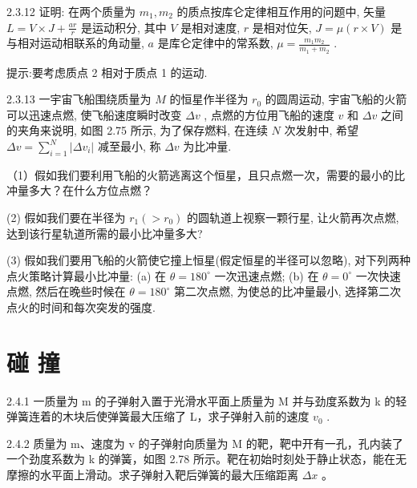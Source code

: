 \begin{problem}{2.3.12}
证明: 在两个质量为 $m_{1}, m_{2}$ 的质点按库仑定律相互作用的问题中, 矢量 $L = V \times J + \frac{ar}{r}$ 是运动积分, 其中 $V$ 是相对速度, $r$ 是相对位矢, $J = \mu(r \times V)$ 是与相对运动相联系的角动量, $a$ 是库仑定律中的常系数, $\mu = \frac{m_1 m_2}{m_1 + m_2}$ .

提示:要考虑质点 2 相对于质点 1 的运动.
\end{problem}
\clearpage


\begin{problem}{2.3.13}
一宇宙飞船围绕质量为 $M$ 的恒星作半径为 $r_0$ 的圆周运动, 宇宙飞船的火箭可以迅速点燃, 使飞船速度瞬时改变 $\Delta v$ , 点燃的方位用飞船的速度 $v$ 和 $\Delta v$ 之间的夹角来说明, 如图 2.75 所示, 为了保存燃料, 在连续 $N$ 次发射中, 希望 $\Delta v = \sum_{i=1}^{N} |\Delta v_i|$ 减至最小, 称 $\Delta v$ 为比冲量.

（1）假如我们要利用飞船的火箭逃离这个恒星，且只点燃一次，需要的最小的比冲量多大？在什么方位点燃？

(2) 假如我们要在半径为 $r_{1}(>r_{0})$ 的圆轨道上视察一颗行星, 让火箭再次点燃, 达到该行星轨道所需的最小比冲量多大?

(3) 假如我们要用飞船的火箭使它撞上恒星(假定恒星的半径可以忽略), 对下列两种点火策略计算最小比冲量: (a) 在 $\theta = 180^{\circ}$ 一次迅速点燃; (b) 在 $\theta = 0^{\circ}$ 一次快速点燃, 然后在晚些时候在 $\theta = 180^{\circ}$ 第二次点燃, 为使总的比冲量最小, 选择第二次点火的时间和每次突发的强度.
\begin{center}

\end{center}
\end{problem}
\clearpage


\section{碰 撞}

\begin{problem}{2.4.1}
一质量为 m 的子弹射入置于光滑水平面上质量为 M 并与劲度系数为 k 的轻弹簧连着的木块后使弹簧最大压缩了 L，求子弹射入前的速度 $v_{0}$ .
\begin{center}

\end{center}
\end{problem}
\clearpage


\begin{problem}{2.4.2}
质量为 m、速度为 v 的子弹射向质量为 M 的靶，靶中开有一孔，孔内装了一个劲度系数为 k 的弹簧，如图 2.78 所示。靶在初始时刻处于静止状态，能在无摩擦的水平面上滑动。求子弹射入靶后弹簧的最大压缩距离 $\Delta x$ 。
\begin{center}

\end{center}
\end{problem}
\clearpage


